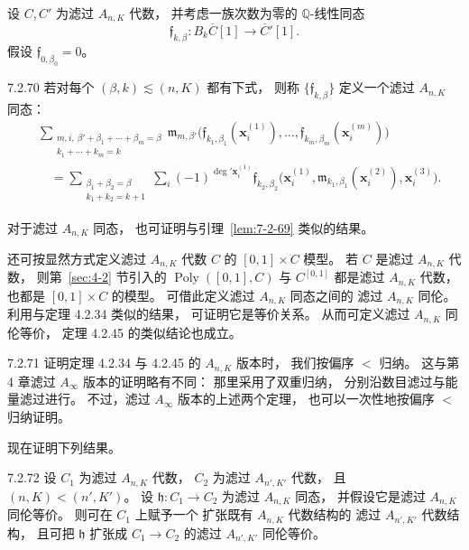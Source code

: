 设 $C,C'$ 为滤过 $A_{n,K}$ 代数，
并考虑一族次数为零的 $\mathbb Q$-线性同态
\[
\mathfrak f_{k,\beta}\colon
B_k\overline C[1]\longrightarrow\overline C'[1].
\]
假设 $\mathfrak f_{0,\beta_0}=0$。
\begin{definition}{7.2.70}\label{def:7-2-70}
若对每个 $(\beta,k)\lesssim(n,K)$ 都有下式，
则称 $\{\mathfrak f_{k,\beta}\}$
定义一个滤过 $A_{n,K}$ 同态：
\begin{equation*}
\begin{aligned}
&\sum_{\substack{m,i,\ \beta'+\beta_1+\cdots+\beta_m=\beta\\
                   k_1+\cdots+k_m=k}}
\mathfrak m_{m,\beta'}
\bigl(\mathfrak f_{k_1,\beta_1}(\mathbf x_i^{(1)}),
\ldots,
\mathfrak f_{k_m,\beta_m}(\mathbf x_i^{(m)})\bigr)\\
&\quad=
\sum_{\substack{\beta_1+\beta_2=\beta\\
                   k_1+k_2=k+1}}
\sum_i(-1)^{\deg'\mathbf x_i^{(1)}}
\mathfrak f_{k_2,\beta_2}
\bigl(\mathbf x_i^{(1)},
\mathfrak m_{k_1,\beta_1}(\mathbf x_i^{(2)}),
\mathbf x_i^{(3)}\bigr).
\end{aligned}
\end{equation*}
\end{definition}

对于滤过 $A_{n,K}$ 同态，
也可证明与引理~\ref{lem:7-2-69} 类似的结果。

还可按显然方式定义滤过 $A_{n,K}$ 代数 $C$ 的
$[0,1]\times C$ 模型。
若 $C$ 是滤过 $A_{n,K}$ 代数，
则第~\ref{sec:4-2} 节引入的
$\operatorname{Poly}([0,1],C)$ 与 $C^{[0,1]}$
都是滤过 $A_{n,K}$ 代数，
也都是 $[0,1]\times C$ 的模型。
可借此定义滤过 $A_{n,K}$ 同态之间的
滤过 $A_{n,K}$ 同伦。
利用与定理 4.2.34 类似的结果，
可证明它是等价关系。
从而可定义滤过 $A_{n,K}$ 同伦等价，
定理 4.2.45 的类似结论也成立。
%

\begin{remark}{7.2.71}\label{rem:7-2-71}
证明定理 4.2.34 与 4.2.45 的 $A_{n,K}$ 版本时，
我们按偏序 $<$ 归纳。
这与第 4 章滤过 $A_\infty$ 版本的证明略有不同：
那里采用了双重归纳，
分别沿数目滤过与能量滤过进行。
不过，滤过 $A_\infty$ 版本的上述两个定理，
也可以一次性地按偏序 $<$ 归纳证明。
\end{remark}

现在证明下列结果。
\begin{theorem}{7.2.72}\label{thm:7-2-72}
设 $C_1$ 为滤过 $A_{n,K}$ 代数，
$C_2$ 为滤过 $A_{n',K'}$ 代数，
且 $(n,K)<(n',K')$。
设 $\mathfrak h\colon C_1\to C_2$
为滤过 $A_{n,K}$ 同态，
并假设它是滤过 $A_{n,K}$ 同伦等价。
则可在 $C_1$ 上赋予一个
扩张既有 $A_{n,K}$ 代数结构的
滤过 $A_{n',K'}$ 代数结构，
且可把 $\mathfrak h$ 扩张成
$C_1\to C_2$ 的滤过 $A_{n',K'}$ 同伦等价。
\end{theorem}

